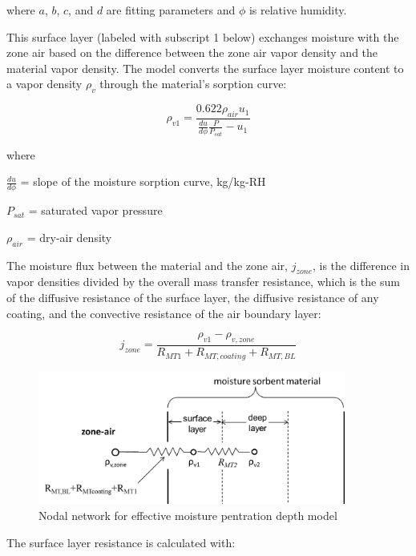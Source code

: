 where \(a\), \(b\), \(c\), and \(d\) are fitting parameters and \(\phi\) is relative humidity.

This surface layer (labeled with subscript 1 below) exchanges moisture with the zone air based on the difference between the zone air vapor density and the material vapor density. The model converts the surface layer moisture content to a vapor density \(\rho_v\) through the material's sorption curve:

\begin{equation}
\rho_{v1} = \frac {0.622 \rho_{air} u_{1}} {\frac{du}{d\phi} \frac{P}{P_{sat}} - u_{1}}
\end{equation}

where

\(\frac{du}{d\phi}\) = slope of the moisture sorption curve, kg/kg-RH

\(P_{sat}\) = saturated vapor pressure

\(\rho_{air}\) = dry-air density

The moisture flux between the material and the zone air, \(j_{zone}\), is the difference in vapor densities divided by the overall mass transfer resistance, which is the sum of the diffusive resistance of the surface layer, the diffusive resistance of any coating, and the convective resistance of the air boundary layer:

\begin{equation}
j_{zone} = \frac{\rho_{v1} - \rho_{v,zone}}{R_{MT1} + R_{MT,coating} + R_{MT,BL}}
\end{equation}

\begin{figure}[hbtp]
\centering
\includegraphics[width=0.9\textwidth, height=0.9\textheight, keepaspectratio=true]{media/EMPDschematic.png}
\caption{Nodal network for effective moisture pentration depth model \protect \label{fig:Nodal-network-for-effective-moisture-penetration-depth-model}}
\end{figure}

The surface layer resistance is calculated with:


